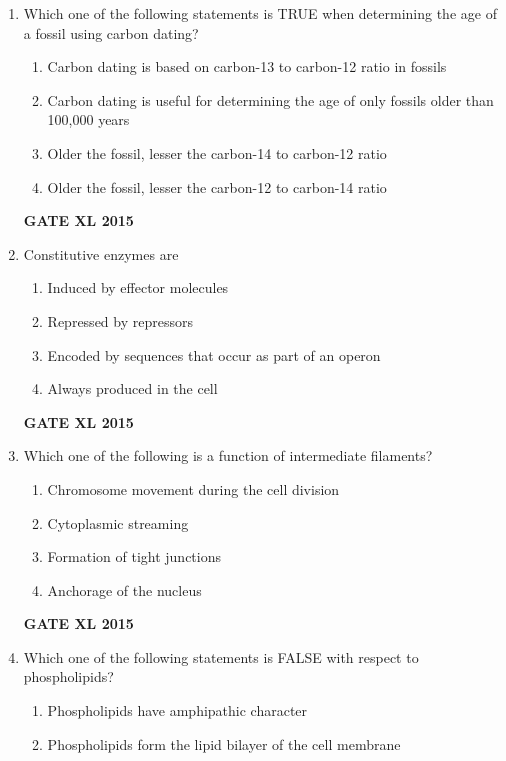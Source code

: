 \documentclass[journal,12pt,onecolumn]{IEEEtran}
\begin{document}
\begin{enumerate}
\item Which one of the following statements is TRUE when determining the age of a fossil using carbon dating?
    \begin{enumerate}
            \item Carbon dating is based on carbon-13 to carbon-12 ratio in fossils
	    \item Carbon dating is useful for determining the age of only fossils older than 100,000 years
	    \item Older the fossil, lesser the carbon-14 to carbon-12 ratio
            \item Older the fossil, lesser the carbon-12 to carbon-14 ratio
    \end{enumerate}
\begin{flushright}\textbf{GATE XL 2015}\end{flushright}
\item Constitutive enzymes are
    \begin{enumerate}
            \item Induced by effector molecules
	    \item Repressed by repressors
	    \item Encoded by sequences that occur as part of an operon
            \item Always produced in the cell
    \end{enumerate}
\begin{flushright}\textbf{GATE XL 2015}\end{flushright}
\item Which one of the following is a function of intermediate filaments?
    \begin{enumerate}
            \item Chromosome movement during the cell division
	    \item Cytoplasmic streaming
	    \item Formation of tight junctions
            \item Anchorage of the nucleus
    \end{enumerate}
\begin{flushright}\textbf{GATE XL 2015}\end{flushright}
\item Which one of the following statements is FALSE with respect to phospholipids?
    \begin{enumerate}
            \item  Phospholipids have amphipathic character
	    \item  Phospholipids form the lipid bilayer of the cell membrane

\end{enumerate}
\end{enumerate}
\end{document}
